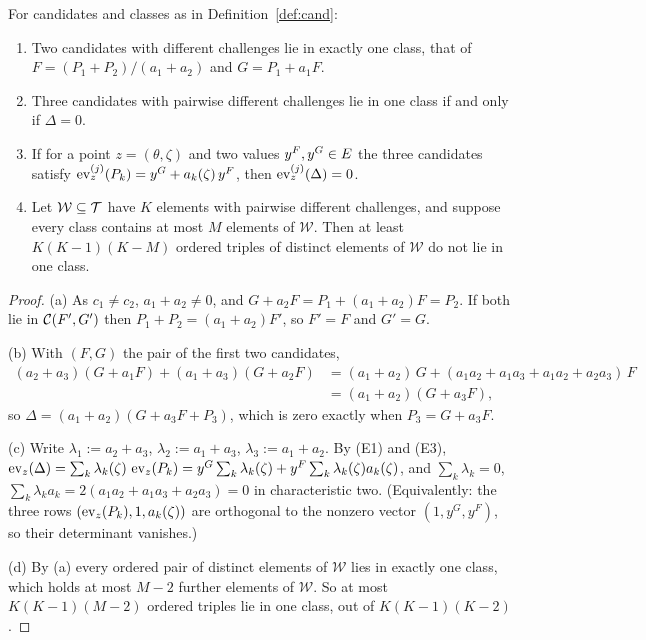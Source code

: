 \begin{lemma}\label{lem:L1}
For candidates and classes as in Definition~\ref{def:cand}:
\begin{enumerate}[itemsep=1pt,topsep=2pt,label=\textnormal{(\alph*)}]
\item Two candidates with different challenges lie in exactly one class, that of $F=(P_1+P_2)/(a_1+a_2)$ and $G=P_1+a_1F$.
\item Three candidates with pairwise different challenges lie in one class if and only if $\Delta=0$.
\item If for a point $z=(\theta,\zeta)$ and two values $y^F,y^G\in E$ the three candidates satisfy $\operatorname{ev}^{(j)}_z(P_k)=y^G+a_k(\zeta)\,y^F$, then $\operatorname{ev}^{(j)}_z(\Delta)=0$.
\item Let $\mathcal W\subseteq\mathcal{T}$ have $K$ elements with pairwise different challenges, and suppose every class contains at most $M$ elements of $\mathcal W$. Then at least $K(K-1)(K-M)$ ordered triples of distinct elements of $\mathcal W$ do not lie in one class.
\end{enumerate}
\end{lemma}
\begin{proof}
(a) As $c_1\ne c_2$, $a_1+a_2\ne0$, and $G+a_2F=P_1+(a_1+a_2)F=P_2$. If both lie in $\mathcal{C}(F',G')$ then $P_1+P_2=(a_1+a_2)F'$, so $F'=F$ and $G'=G$.

(b) With $(F,G)$ the pair of the first two candidates,
\begin{align*}
(a_2+a_3)(G+a_1F)+(a_1+a_3)(G+a_2F)&=(a_1+a_2)\,G+(a_1a_2+a_1a_3+a_1a_2+a_2a_3)\,F\\
&=(a_1+a_2)(G+a_3F),
\end{align*}
so $\Delta=(a_1+a_2)(G+a_3F+P_3)$, which is zero exactly when $P_3=G+a_3F$.

(c) Write $\lambda_1:=a_2+a_3$, $\lambda_2:=a_1+a_3$, $\lambda_3:=a_1+a_2$. By (E1) and (E3), $\operatorname{ev}_z(\Delta)=\sum_k\lambda_k(\zeta)\,\operatorname{ev}_z(P_k)=y^G\sum_k\lambda_k(\zeta)+y^F\sum_k\lambda_k(\zeta)a_k(\zeta)$, and $\sum_k\lambda_k=0$, $\sum_k\lambda_ka_k=2(a_1a_2+a_1a_3+a_2a_3)=0$ in characteristic two. (Equivalently: the three rows $(\operatorname{ev}_z(P_k),1,a_k(\zeta))$ are orthogonal to the nonzero vector $(1,y^G,y^F)$, so their determinant vanishes.)

(d) By (a) every ordered pair of distinct elements of $\mathcal W$ lies in exactly one class, which holds at most $M-2$ further elements of $\mathcal W$. So at most $K(K-1)(M-2)$ ordered triples lie in one class, out of $K(K-1)(K-2)$.
\end{proof}

